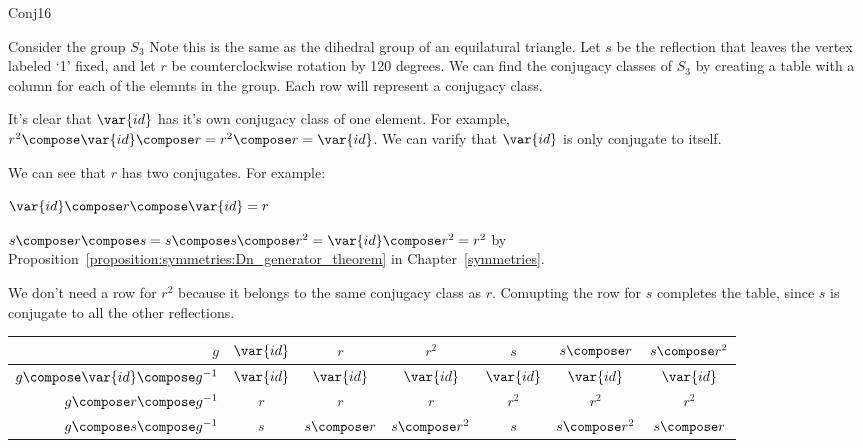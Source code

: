 \begin {example}{Conj16}

Consider the group $S_3$  Note this is the same as the dihedral group of an equilatural triangle.  
Let $s$ be the reflection that leaves the vertex labeled `1' fixed, and let $r$ be counterclockwise rotation by 120 degrees.  We can find the conjugacy classes of $S_3$ by creating a table with a column for each of the elemnts in the group.  Each row will represent a conjugacy class.  

It's clear that $\var{id}$ has it's own conjugacy class of one element.  For example, 
$r^2\compose \var{id} \compose r=r^2\compose r=\var{id}$. We can varify that $\var{id}$ is only conjugate to itself.

 We can see that $r$ has two conjugates.  For example:

 $\var{id}\compose r \compose \var{id}=r$ 

$s\compose r \compose s=s\compose s\compose r^2=\var{id}\compose r^2=r^2$
by Proposition~\ref{proposition:symmetries:Dn_generator_theorem}  in Chapter~\ref{symmetries}.  

%


We don't need a row for $r^2$ because it belongs to the same conjugacy class as $r$.  
Comupting the row for $s$ completes the table, since $s$ is conjugate to all the other reflections.

\begin{center}
\begin{tabular}{|r | c | c |c | c | c |c |}\hline
$g$ &$\var{id}$ & $r$ &$r^2$ &$ s$ &$ s\compose r$ & $s\compose r ^2$\\ \hline
$g\compose \var{id}\compose g^{-1}$ & $\var{id}$ & $\var{id}$ & $\var{id}$ &$\var{id}$ &$\var{id}$ &$\var{id}$ \\ \hline
$ g\compose r\compose g^{-1}$& $r$&$ r$& $r$&$r^2$ &$r^2$ & $r^2$\\ \hline
$g\compose s\compose g^{-1}$ & $s$ &$ s\compose r$ & $s\compose r^2$ & $s$ & $s\compose r^2$ & $s\compose r$\\ \hline 
\end{tabular}
\end{center}


\end{example}
